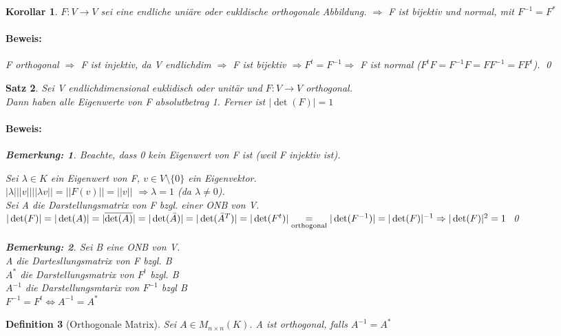 \documentclass{report}
\newcommand{\lb}{\lambda}
\theoremstyle{customrem}
\newtheorem*{bemerkung}{Bemerkung\textnormal:}
\theoremstyle{customdef}
\newtheorem{definition}{Definition}[chapter]
\newtheorem{korrolar}[definition]{Korollar}
\newtheorem{satz}[definition]{Satz}
\renewenvironment{proof}{\paragraph{Beweis: }}{\qed}
\theoremstyle{customenv}
\begin{document}
\begin{korrolar}
  \(F : V \to V\) sei eine endliche uni\"are oder eukldische orthogonale Abbildung.
  \(\Rightarrow\) F ist bijektiv und normal, mit \(F^{-1} = F^*\)
  \begin{proof}
    F orthogonal \(\Rightarrow\) F ist injektiv, da V endlichdim \(\Rightarrow\)
    F ist bijektiv \(\Rightarrow F^t = F^{-1} \Rightarrow\) F ist normal
    (\(F^t F = F^{-1} F = F F^{-1} = F F^t\)).
  \end{proof}
\end{korrolar}

\begin{satz}
  Sei V endlichdimensional euklidisch oder unit\"ar und \(F : V \to V\)
  orthogonal.\\
  Dann haben alle Eigenwerte von F absolutbetrag 1. Ferner ist \(|\det(F)| = 1\)
  \begin{proof}
    \begin{bemerkung}
      Beachte, dass 0 kein Eigenwert von F ist (weil F injektiv ist).
    \end{bemerkung}
    Sei \(\lb \in K\) ein Eigenwert von F, \(v \in V \setminus \{0\}\) ein
    Eigenvektor.\\
    \( |\lb| ||v|| ||\lb v|| = ||F(v)|| = ||v||\)
    \(\Rightarrow \lb = 1\) (da \(\lb \neq 0\)).\\
    Sei A die Darstellungsmatrix von F bzgl. einer ONB von V.\\
    \(|\det(F)| = |\det(A)| = |\overline{\det(A)}| = |\det(\bar A)|
    = |\det(\bar A^T)| = |\det(F^t)| \underset{\text{orthogonal}}{=}
    |\det(F^{-1})| = |\det(F)|^{-1}\\
    \Rightarrow |\det(F)|^2 = 1\)
  \end{proof}
  \begin{bemerkung}
    Sei B eine ONB von V.\\
    A die Dartesllungsmatrix von F bzgl. B\\
    \(A^*\) die Darstellungsmatrix von \(F^t\) bzgl. B\\
    \(A^{-1}\) die Darstellungsmtarix von \(F^{-1}\) bzgl B\\
    \(F^{-1} = F^t \Leftrightarrow A^{-1} = A^*\)
  \end{bemerkung}
\end{satz}

\begin{definition}[Orthogonale Matrix]
  Sei \(A \in M_{n \times n}(K)\). A ist orthogonal, falls \(A^{-1} = A^*\) 
\end{definition}
\end{document}
